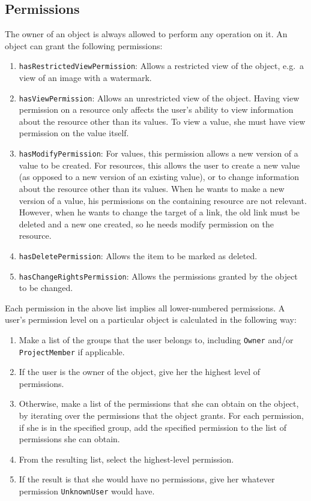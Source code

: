 \documentclass[12pt, a4paper]{article}
\begin{document}
\subsection{Permissions}

The owner of an object is always allowed to perform any operation on it. An object can grant the following permissions:

\begin{enumerate}
	\item \texttt{hasRestrictedViewPermission}: Allows a restricted view of the object, e.g.\ a view of an image with a watermark.
	\item \texttt{hasViewPermission}: Allows an unrestricted view of the object. Having view permission on a resource only affects the user's ability to view information about the resource other than its values. To view a value, she must have view permission on the value itself.
	\item \texttt{hasModifyPermission}: For values, this permission allows a new version of a value to be created. For resources, this allows the user to create a new value (as opposed to a new version of an existing value), or to change information about the resource other than its values. When he wants to make a new version of a value, his permissions on the containing resource are not relevant. However, when he wants to change the target of a link, the old link must be deleted and a new one created, so he needs modify permission on the resource.
	\item \texttt{hasDeletePermission}: Allows the item to be marked as deleted.
	\item \texttt{hasChangeRightsPermission}: Allows the permissions granted by the object to be changed.
\end{enumerate}

Each permission in the above list implies all lower-numbered permissions. A user's permission level on a particular object is calculated in the following way:

\begin{enumerate}
	\item Make a list of the groups that the user belongs to, including \texttt{Owner} and/or \texttt{ProjectMember} if applicable.
	\item If the user is the owner of the object, give her the highest level of permissions.
	\item Otherwise, make a list of the permissions that she can obtain on the object, by iterating over the permissions that the object grants. For each permission, if she is in the specified group, add the specified permission to the list of permissions she can obtain.
    \item From the resulting list, select the highest-level permission.
    \item If the result is that she would have no permissions, give her whatever permission \texttt{UnknownUser} would have.
\end{enumerate}
\end{document}
